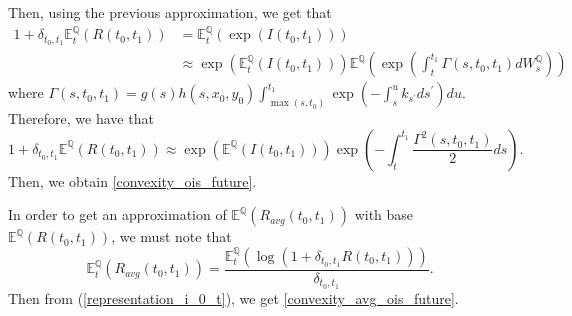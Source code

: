 \documentclass[a4paper,10pt]{article}
\newcommand{\1}{\mathbf{1}}
\begin{document}
Then, using the previous approximation, we get that
\begin{align*}
1 + \delta_{t_0,t_1}\mathbb{E}_t^{\mathbb{Q}}\left(R(t_0,t_1)\right) &= \mathbb{E}_t^{\mathbb{Q}}\left( \exp(I(t_0,t_1)) \right)\\
&\approx \exp\left(\mathbb{E}_t^{\mathbb{Q}}\left(I(t_0,t_1)\right)\right)  \mathbb{E}^{\mathbb{Q}}\left(\exp\left(\int_{t}^{t_1} \Gamma(s,t_0,t_1)dW_s^{\mathbb{Q}}\right)\right)
\end{align*}
where $\Gamma(s,t_0,t_1)= g(s)h(s,x_0,y_0)\int_{\max(s, t_{0})}^{t_1} \exp\left( -\int_{s}^{u} k_{s^{\prime}} ds^{\prime}\right)du$.\\
Therefore, we have that
\begin{equation}\label{representation_i_0_t}
1 + \delta_{t_0,t_1}\mathbb{E}^{\mathbb{Q}}\left(R(t_0,t_1)\right) \approx \exp\left(\mathbb{E}^{\mathbb{Q}}\left(I(t_0,t_1)\right)\right)\exp\left(-\int_{t}^{t_1}\frac{\Gamma^{2}(s,t_0,t_1)}{2} ds\right).
\end{equation}
Then, we obtain \eqref{convexity_ois_future}.

In order to get an approximation of $\mathbb{E}^{\mathbb{Q}}\left(R_{avg}(t_0,t_1)\right)$ with base $\mathbb{E}^{\mathbb{Q}}\left(R(t_0,t_1)\right)$, we must note that 
\begin{equation*}
\mathbb{E}_t^{\mathbb{Q}}\left(R_{avg}(t_0,t_1)\right) = \frac{\mathbb{E}_t^{\mathbb{Q}}\left( \log(1+ \delta_{t_0,t_1} R(t_0,t_1))\right)}{ \delta_{t_0,t_1}}.
\end{equation*}
Then from (\ref{representation_i_0_t}), we get \eqref{convexity_avg_ois_future}.
\end{document}
